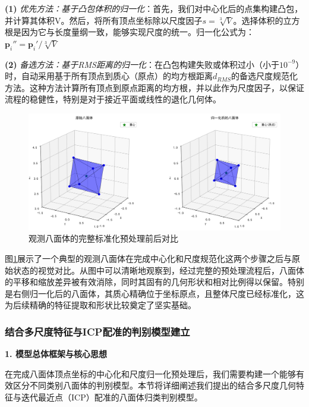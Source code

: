     \textbf{(1)} \textit{优先方法：基于凸包体积的归一化}：首先，我们对中心化后的点集构建凸包，并计算其体积V。然后，将所有顶点坐标除以尺度因子$s = \sqrt[3]{V}$。选择体积的立方根是因为它与长度量纲一致，能够实现尺度的统一。归一化公式为：
    $\mathbf{p}_i'' = \mathbf{p}_i' / \sqrt[3]{V}$
    
    \textbf{(2)} \textit{备选方法：基于RMS距离的归一化}：在凸包构建失败或体积过小（小于$10^{-9}$）时，自动采用基于所有顶点到质心（原点）的均方根距离$d_{RMS}$的备选尺度规范化方法。这种方法计算所有顶点到原点距离的均方根，并以此作为尺度因子，以保证流程的稳健性，特别是对于接近平面或线性的退化几何体。
    
    \begin{figure}[H]
        \centering
        \includegraphics[width=1\textwidth]{figures2/octahedron_normalization.png}
        \caption{观测八面体的完整标准化预处理前后对比}
        \label{fig:octahedron_normalize}
    \end{figure}
    
    图\ref{fig:octahedron_normalize}展示了一个典型的观测八面体在完成中心化和尺度规范化这两个步骤之后与原始状态的视觉对比。从图中可以清晰地观察到，经过完整的预处理流程后，八面体的平移和缩放差异被有效消除，同时其固有的几何形状和相对比例得以保留。特别是右侧归一化后的八面体，其质心精确位于坐标原点，且整体尺度已经标准化，这为后续精确的特征提取和形状比较奠定了坚实基础。
    
\subsubsection{结合多尺度特征与ICP配准的判别模型建立}

\textbf{1. 模型总体框架与核心思想}

在完成八面体顶点坐标的中心化和尺度归一化预处理后，我们需要构建一个能够有效区分不同类别八面体的判别模型。本节将详细阐述我们提出的结合多尺度几何特征与迭代最近点（ICP）配准的八面体归类判别模型。

